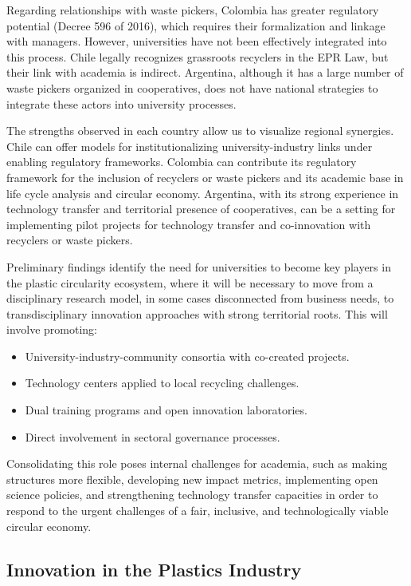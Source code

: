 \documentclass[
  12pt,
  oneside]{book}
\providecommand{\tightlist}{%
  \setlength{\itemsep}{0pt}\setlength{\parskip}{0pt}}
\begin{document}
Regarding relationships with waste pickers, Colombia has greater
regulatory potential (Decree 596 of 2016), which requires their
formalization and linkage with managers. However, universities have not
been effectively integrated into this process. Chile legally recognizes
grassroots recyclers in the EPR Law, but their link with academia is
indirect. Argentina, although it has a large number of waste pickers
organized in cooperatives, does not have national strategies to
integrate these actors into university processes.

The strengths observed in each country allow us to visualize regional
synergies. Chile can offer models for institutionalizing
university-industry links under enabling regulatory frameworks. Colombia
can contribute its regulatory framework for the inclusion of recyclers
or waste pickers and its academic base in life cycle analysis and
circular economy. Argentina, with its strong experience in technology
transfer and territorial presence of cooperatives, can be a setting for
implementing pilot projects for technology transfer and co-innovation
with recyclers or waste pickers.

Preliminary findings identify the need for universities to become key
players in the plastic circularity ecosystem, where it will be necessary
to move from a disciplinary research model, in some cases disconnected
from business needs, to transdisciplinary innovation approaches with
strong territorial roots. This will involve promoting:

\begin{itemize}
\tightlist
\item
  University-industry-community consortia with co-created projects.
\item
  Technology centers applied to local recycling challenges.
\item
  Dual training programs and open innovation laboratories.
\item
  Direct involvement in sectoral governance processes.
\end{itemize}

Consolidating this role poses internal challenges for academia, such as
making structures more flexible, developing new impact metrics,
implementing open science policies, and strengthening technology
transfer capacities in order to respond to the urgent challenges of a
fair, inclusive, and technologically viable circular economy.

\subsection{Innovation in the Plastics
Industry}\label{innovation-in-the-plastics-industry}
\end{document}
